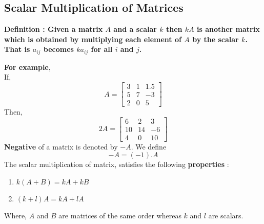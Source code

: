 \documentclass[12pt, letterpaper]{article}
\begin{document}
\subsection{Scalar Multiplication of Matrices}
\begin{displayquote}
\textbf{Definition : Given a matrix $A$ and a scalar $k$ then $kA$ is another matrix which is obtained by multiplying each element of $A$ by the scalar $k$. That is $a_{ij}$ becomes $ka_{ij}$ for all $i$ and $j$.} 
\end{displayquote}
\textbf{For example},\\
If,
\begin{displaymath}
A = \begin{bmatrix}
3 & 1 & 1.5\\
5 & 7 & -3\\
2 & 0 & 5
\end{bmatrix}
\end{displaymath}
Then, 
\begin{displaymath}
2A = \begin{bmatrix}
6 & 2 & 3\\
10 & 14 & -6\\
4 & 0 & 10
\end{bmatrix}
\end{displaymath}
\textbf{Negative} of a matrix is denoted by $-A$. We define 
\begin{displaymath}
-A = (-1).A
\end{displaymath}
The scalar multiplication of matrix, satisfies the following \textbf{properties} :
\begin{enumerate}
    \item $k(A+B) = kA + kB$
    \item $(k+l)A = kA +lA$
\end{enumerate}
Where, $A$ and $B$ are matrices of the same order whereas $k$ and $l$ are scalars.
\end{document}
